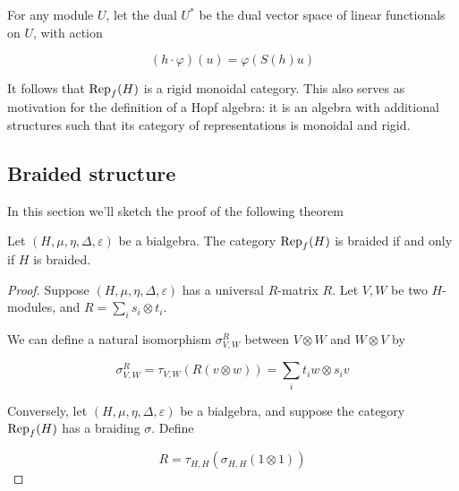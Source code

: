 For any module $U$, let the dual $U^*$ be the dual vector space of linear
functionals on $U$, with action

\begin{equation}
    (h\cdot \varphi)(u)  = \varphi(S(h) u)
\end{equation}

It follows that $\operatorname{Rep}_f(H)$ is a rigid monoidal category. This also serves as
motivation for the definition of a Hopf algebra: it is an algebra with
additional structures such that its category of representations is monoidal and
rigid. 


\subsection{Braided structure}
\label{bialgtocategory}
In this section we'll sketch the proof of the following theorem

\begin{theorem}
    Let $(H, \mu, \eta, \Delta, \varepsilon)$ be a bialgebra. The category $\operatorname{Rep}_f(H)$ is braided if and only if $H$ is braided. 
\end{theorem}
\begin{proof}
    Suppose $(H, \mu, \eta, \Delta, \varepsilon)$ has a universal $R$-matrix $R$. Let $V,W$ be two $H$-modules, and $R = \sum_{i} s_i \otimes t_i$. 

    We can define a natural isomorphism $\sigma_{V,W}^R$ between $V \otimes W$ and $W \otimes V$ by

    \begin{equation}
        \sigma_{V,W}^R = \tau_{V,W}(R(v \otimes w)) = \sum_{i} t_i w \otimes s_i v
    \end{equation}

    Conversely, let $(H, \mu, \eta, \Delta, \varepsilon)$ be a bialgebra, and suppose the category $\operatorname{Rep}_f(H)$ has a braiding $\sigma$. Define 

    \begin{equation}
        R = \tau_{H,H}(\sigma_{H,H}(1 \otimes 1))
    \end{equation}

\end{proof}


